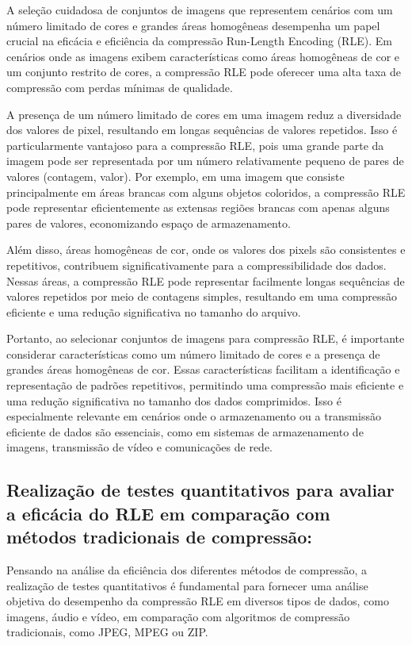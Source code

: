 \documentclass{article}
\begin{document}
A seleção cuidadosa de conjuntos de imagens que representem cenários com um número limitado de cores e grandes áreas homogêneas desempenha um papel crucial na eficácia e eficiência da compressão Run-Length Encoding (RLE). Em cenários onde as imagens exibem características como áreas homogêneas de cor e um conjunto restrito de cores, a compressão RLE pode oferecer uma alta taxa de compressão com perdas mínimas de qualidade.

A presença de um número limitado de cores em uma imagem reduz a diversidade dos valores de pixel, resultando em longas sequências de valores repetidos. Isso é particularmente vantajoso para a compressão RLE, pois uma grande parte da imagem pode ser representada por um número relativamente pequeno de pares de valores (contagem, valor). Por exemplo, em uma imagem que consiste principalmente em áreas brancas com alguns objetos coloridos, a compressão RLE pode representar eficientemente as extensas regiões brancas com apenas alguns pares de valores, economizando espaço de armazenamento.

Além disso, áreas homogêneas de cor, onde os valores dos pixels são consistentes e repetitivos, contribuem significativamente para a compressibilidade dos dados. Nessas áreas, a compressão RLE pode representar facilmente longas sequências de valores repetidos por meio de contagens simples, resultando em uma compressão eficiente e uma redução significativa no tamanho do arquivo.

Portanto, ao selecionar conjuntos de imagens para compressão RLE, é importante considerar características como um número limitado de cores e a presença de grandes áreas homogêneas de cor. Essas características facilitam a identificação e representação de padrões repetitivos, permitindo uma compressão mais eficiente e uma redução significativa no tamanho dos dados comprimidos. Isso é especialmente relevante em cenários onde o armazenamento ou a transmissão eficiente de dados são essenciais, como em sistemas de armazenamento de imagens, transmissão de vídeo e comunicações de rede.

\subsection{Realização de testes quantitativos para avaliar a eficácia do RLE em comparação com métodos tradicionais de compressão:}

Pensando na análise da eficiência dos diferentes métodos de compressão, a realização de testes quantitativos é fundamental para fornecer uma análise objetiva do desempenho da compressão RLE em diversos tipos de dados, como imagens, áudio e vídeo, em comparação com algoritmos de compressão tradicionais, como JPEG, MPEG ou ZIP.
\end{document}
